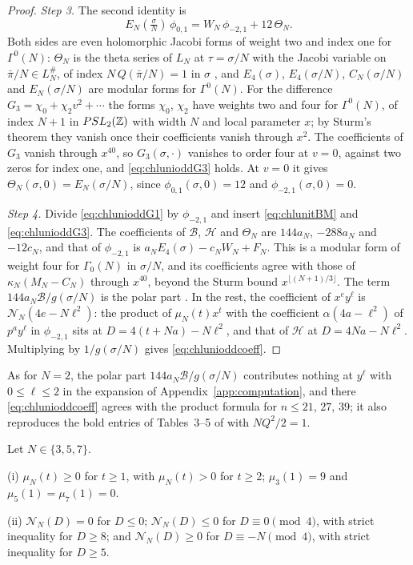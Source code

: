 \begin{proof}
\emph{Step 3.} The second identity is
\begin{equation}\label{eq:chlunioddG3}
E_N(\tfrac\sigma N)\,\phi_{0,1}=W_N\,\phi_{-2,1}+12\,\Theta_N .
\end{equation}
Both sides are even holomorphic Jacobi forms of weight two and index one for $\Gamma^0(N)$: $\Theta_N$ is the theta series of $L_N$ at $\tau=\sigma/N$ with the Jacobi variable on $\bar\pi/N\in L_N^\#$, of index $N\,Q(\bar\pi/N)=1$ in $\sigma$ \cite[\S7]{EZ85}, and $E_4(\sigma)$, $E_4(\sigma/N)$, $C_N(\sigma/N)$ and $E_N(\sigma/N)$ are modular forms for $\Gamma^0(N)$. For the difference $G_3=\chi_0+\chi_2v^2+\cdots$ the forms $\chi_0$, $\chi_2$ have weights two and four for $\Gamma^0(N)$, of index $N+1$ in $PSL_2(\mathbb{Z})$ with width $N$ and local parameter $x$; by Sturm's theorem they vanish once their coefficients vanish through $x^2$. The coefficients of $G_3$ vanish through $x^{40}$, so $G_3(\sigma,\cdot)$ vanishes to order four at $v=0$, against two zeros for index one, and \eqref{eq:chlunioddG3} holds. At $v=0$ it gives $\Theta_N(\sigma,0)=E_N(\sigma/N)$, since $\phi_{0,1}(\sigma,0)=12$ and $\phi_{-2,1}(\sigma,0)=0$.

\emph{Step 4.} Divide \eqref{eq:chlunioddG1} by $\phi_{-2,1}$ and insert \eqref{eq:chlunitBM} and \eqref{eq:chlunioddG3}. The coefficients of $\mathcal B$, $\mathcal H$ and $\Theta_N$ are $144a_N$, $-288a_N$ and $-12c_N$, and that of $\phi_{-2,1}$ is $a_NE_4(\sigma)-c_NW_N+F_N$. This is a modular form of weight four for $\Gamma_0(N)$ in $\sigma/N$, and its coefficients agree with those of $\kappa_N(M_N-C_N)$ through $x^{40}$, beyond the Sturm bound $x^{\lfloor(N+1)/3\rfloor}$. The term $144a_N\mathcal B/g(\sigma/N)$ is the polar part \cite[(5.45)]{BSS25}. In the rest, the coefficient of $x^ey^\ell$ is $\mathcal N_N(4e-N\ell^2)$: the product of $\mu_N(t)x^t$ with the coefficient $\alpha(4a-\ell^2)$ of $p^ay^\ell$ in $\phi_{-2,1}$ sits at $D=4(t+Na)-N\ell^2$, and that of $\mathcal H$ at $D=4Na-N\ell^2$. Multiplying by $1/g(\sigma/N)$ gives \eqref{eq:chlunioddcoeff}.
\end{proof}

As for $N=2$, the polar part $144a_N\mathcal B/g(\sigma/N)$ contributes nothing at $y^\ell$ with $0\le\ell\le2$ in the expansion of Appendix~\ref{app:computation}, and there \eqref{eq:chlunioddcoeff} agrees with the product formula for $n\le21$, $27$, $39$; it also reproduces the bold entries of Tables~3--5 of \cite{Sen11positivity} with $NQ^2/2=1$.

\begin{lemma}\label{lem:chlunioddsigns}
Let $N\in\{3,5,7\}$.

\textup{(i)} $\mu_N(t)\ge0$ for $t\ge1$, with $\mu_N(t)>0$ for $t\ge2$; $\mu_3(1)=9$ and $\mu_5(1)=\mu_7(1)=0$.

\textup{(ii)} $\mathcal N_N(D)=0$ for $D\le0$; $\mathcal N_N(D)\le0$ for $D\equiv0\pmod4$, with strict inequality for $D\ge8$; and $\mathcal N_N(D)\ge0$ for $D\equiv-N\pmod4$, with strict inequality for $D\ge5$.
\end{lemma}

